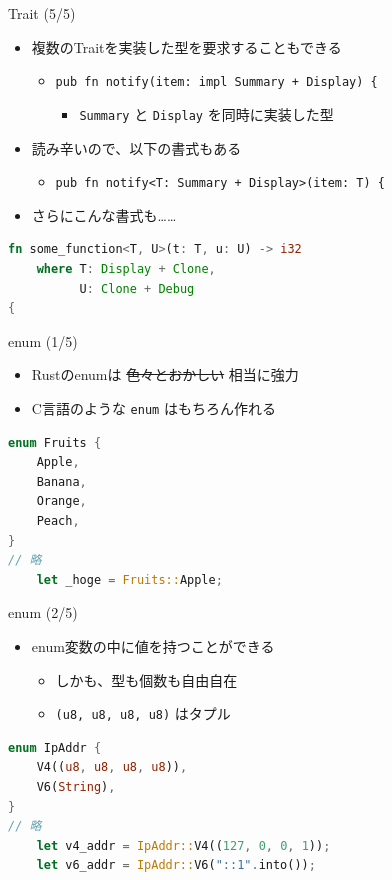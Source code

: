 \documentclass[cjk,dvipdfmx,10pt,compress,fragile%
hyperref={bookmarks=true,bookmarksnumbered=true,bookmarksopen=false,%
colorlinks=false,%
pdftitle={第 134 回 関西 Debian 勉強会},%
pdfauthor={小林},%
pdfsubject={資料},%
}]{beamer}
\begin{document}
\begin{frame}[t,fragile]{Trait (5/5)}
 \begin{itemize}
  \item 複数のTraitを実装した型を要求することもできる
	\begin{itemize}
	 \item \verb|pub fn notify(item: impl Summary + Display) {|
	       \begin{itemize}
		\item \verb|Summary| と \verb|Display| を同時に実装した型
	       \end{itemize}
	\end{itemize}
  \item 読み辛いので、以下の書式もある
	\begin{itemize}
	 \item \verb|pub fn notify<T: Summary + Display>(item: T) {|
	\end{itemize}
  \item さらにこんな書式も……
 \end{itemize}
\begin{lstlisting}[language=Rust,style=boxed,style=colouredRust,basicstyle=\small\tt,lineskip=-2pt]
fn some_function<T, U>(t: T, u: U) -> i32
    where T: Display + Clone,
          U: Clone + Debug
{\end{lstlisting}
\end{frame}

\begin{frame}[t,fragile]{enum (1/5)}
 \begin{itemize}
  \item Rustのenumは \sout{色々とおかしい} 相当に強力
  \item C言語のような \texttt{enum} はもちろん作れる
 \end{itemize}
\begin{lstlisting}[language=Rust,style=boxed,style=colouredRust,basicstyle=\small\tt,lineskip=-2pt]
enum Fruits {
    Apple,
    Banana,
    Orange,
    Peach,
}
// 略
    let _hoge = Fruits::Apple;\end{lstlisting}
\end{frame}

\begin{frame}[t,fragile]{enum (2/5)}
 \begin{itemize}
  \item enum変数の中に値を持つことができる
	\begin{itemize}
	 \item しかも、型も個数も自由自在
	 \item \verb|(u8, u8, u8, u8)| はタプル
	\end{itemize}
 \end{itemize}
\begin{lstlisting}[language=Rust,style=boxed,style=colouredRust,basicstyle=\small\tt,lineskip=-2pt]
enum IpAddr {
    V4((u8, u8, u8, u8)),
    V6(String),
}
// 略
    let v4_addr = IpAddr::V4((127, 0, 0, 1));
    let v6_addr = IpAddr::V6("::1".into());\end{lstlisting}
\end{frame}
\end{document}
